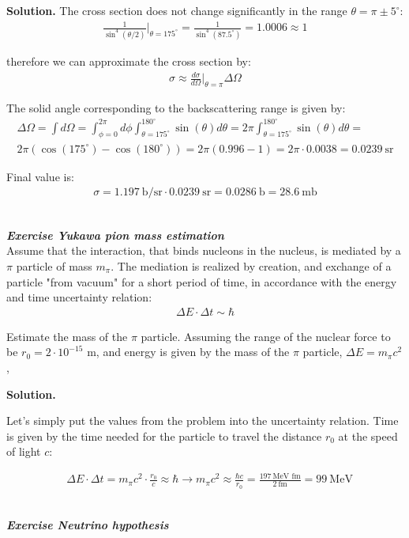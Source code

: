 \documentclass[11pt,a4paper]{article}
\newcounter{zadanie}\newcommand{\zadanie}[1][]{\addtocounter{zadanie}{1} ~\\  {\bf \emph{Exercise \arabic{zadanie} #1 }} \\}
\newenvironment{solution}{\vspace{1cm} \par\textbf{Solution.} \vspace{1cm}}{\newpage}
\begin{document}
\begin{solution}
The cross section does not change significantly in the range $\theta = \pi \pm 5^\circ$:
\begin{align*}
    \frac{1}{\sin^4(\theta/2)} \Big|_{\theta = 175^\circ} = \frac{1}{\sin^4(87.5^\circ)} = 1.0006 \approx 1
\end{align*}

therefore we can approximate the cross section by:
\begin{align*}
    \sigma \approx \frac{d\sigma}{d\Omega}\Big|_{\theta = \pi} \Delta \Omega
\end{align*}


The solid angle corresponding to the backscattering range is given by:
\begin{align*}
\Delta \Omega = \int d\Omega = 
\int_{\phi=0}^{2\pi} d\phi \int_{\theta=175^\circ}^{180^\circ} \sin(\theta) d\theta
= 2 \pi \int_{\theta=175^\circ}^{180^\circ} \sin(\theta) d\theta =\\
2 \pi (\cos(175^\circ) - \cos(180^\circ)) = 2 \pi (0.996 - 1)
= 2 \pi \cdot 0.0038 = 0.0239~\text{sr}
\end{align*}

Final value is:
\begin{align*}
\sigma = 1.197~\text{b/sr} \cdot 0.0239~\text{sr} = 
0.0286~\text{b} = 28.6~\text{mb}
\end{align*}

\newpage
\end{solution}
\zadanie[Yukawa pion mass estimation]

Assume that the interaction, that binds nucleons in the nucleus, 
is mediated by a $\pi$ particle of mass $m_\pi$. The mediation is realized 
by creation, and exchange of a particle "from vacuum" for a short period of time,
in accordance with the energy and time uncertainty relation:
\begin{align*}
\Delta E \cdot \Delta t \sim \hbar
\end{align*}

Estimate the mass of the $\pi$ particle.
Assuming the range of the nuclear force to be $r_0 = 2 \cdot 10^{-15}$ m, 
and energy is given by the mass of the $\pi$ particle, $\Delta E = m_\pi c^2$,

\begin{solution}

Let's simply put the values from the problem into the uncertainty relation.
Time is given by the time needed for the particle to travel the distance $r_0$ at 
the speed of light $c$:

\begin{align*}
& \Delta E \cdot \Delta t = m_\pi c^2 \cdot \frac{r_0}{c} \approx \hbar \to 
m_\pi c^{2} \approx \frac{\hbar c}{r_0} = \frac{197~\text{MeV fm}}{2~\text{fm}} =
99~\text{MeV}
\end{align*}

\end{solution}
\zadanie[Neutrino hypothesis]
\end{document}
